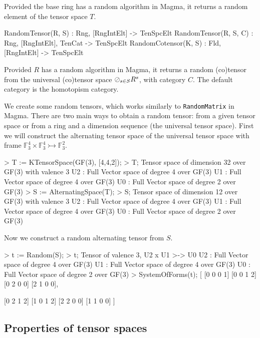 Provided the base ring has a random algorithm in Magma, it returns a random 
element of the tensor space $T$.

\begin{intrinsics}
RandomTensor(R, S) : Rng, [RngIntElt] -> TenSpcElt
RandomTensor(R, S, C) : Rng, [RngIntElt], TenCat -> TenSpcElt
RandomCotensor(K, S) : Fld, [RngIntElt] -> TenSpcElt
\end{intrinsics}

Provided $R$ has a random algorithm in Magma, it returns a random (co)tensor from 
the universal (co)tensor space $\oslash_{s\in S} R^{s}$, with category $C$.
The default category is the homotopism category.

\begin{example}[RandomTensors]

We create some random tensors, which works similarly to \texttt{RandomMatrix} in Magma.
There are two main ways to obtain a random tensor: from a given tensor space or from a ring and a dimension sequence (the universal tensor space). 
First we will construct the alternating tensor space of the universal tensor space with frame $\mathbb{F}_3^4\times\mathbb{F}_3^4\rightarrowtail \mathbb{F}_3^2$.
\begin{code}
> T := KTensorSpace(GF(3), [4,4,2]);
> T;
Tensor space of dimension 32 over GF(3) with valence 3
U2 : Full Vector space of degree 4 over GF(3)
U1 : Full Vector space of degree 4 over GF(3)
U0 : Full Vector space of degree 2 over GF(3)
> S := AlternatingSpace(T);
> S;
Tensor space of dimension 12 over GF(3) with valence 3
U2 : Full Vector space of degree 4 over GF(3)
U1 : Full Vector space of degree 4 over GF(3)
U0 : Full Vector space of degree 2 over GF(3)
\end{code}

Now we construct a random alternating tensor from $S$.
\begin{code}
> t := Random(S);
> t;
Tensor of valence 3, U2 x U1 >-> U0
U2 : Full Vector space of degree 4 over GF(3)
U1 : Full Vector space of degree 4 over GF(3)
U0 : Full Vector space of degree 2 over GF(3)
> SystemOfForms(t);
[
    [0 0 0 1]
    [0 0 1 2]
    [0 2 0 0]
    [2 1 0 0],

    [0 2 1 2]
    [1 0 1 2]
    [2 2 0 0]
    [1 1 0 0]
]
\end{code}
\end{example}

\subsection{Properties of tensor spaces}

